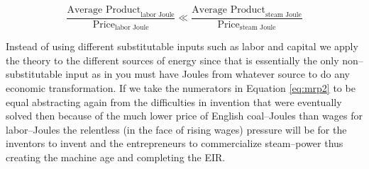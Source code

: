 		\begin{equation}
		\label{eq:mrp2}
		\frac{\text{Average Product}_{\text{labor Joule}}}{\text{Price}_{\text{labor Joule}}} \ll \frac{\text{Average Product}_{\text{steam Joule}}}{\text{Price}_{\text{steam Joule}}}
		\end{equation}

Instead of using different substitutable inputs such as labor and capital we apply the theory to the different sources of energy since that is essentially the only non--substitutable input as in you must have Joules from whatever source to do any economic transformation. If we take the numerators in Equation \ref{eq:mrp2} to be equal abstracting again from the difficulties in invention that were eventually solved then because of the much lower price of English coal--Joules than wages for labor--Joules the relentless (in the face of rising wages) pressure will be for the inventors to invent and the entrepreneurs to commercialize steam--power thus creating the machine age and completing the EIR.
